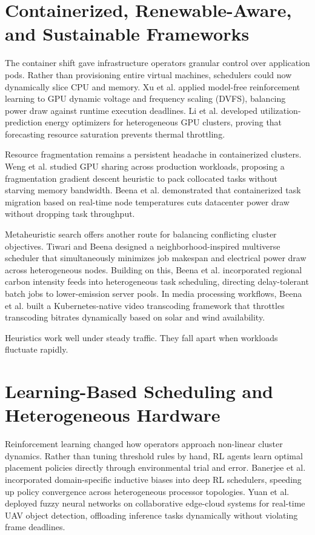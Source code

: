 \documentclass[12pt]{report}
\begin{document}
\section{Containerized, Renewable-Aware, and Sustainable Frameworks}

The container shift gave infrastructure operators granular control over application pods. Rather than provisioning entire virtual machines, schedulers could now dynamically slice CPU and memory. Xu et al. \cite{xu2022} applied model-free reinforcement learning to GPU dynamic voltage and frequency scaling (DVFS), balancing power draw against runtime execution deadlines. Li et al. \cite{li2023} developed utilization-prediction energy optimizers for heterogeneous GPU clusters, proving that forecasting resource saturation prevents thermal throttling. 

Resource fragmentation remains a persistent headache in containerized clusters. Weng et al. \cite{weng2023} studied GPU sharing across production workloads, proposing a fragmentation gradient descent heuristic to pack collocated tasks without starving memory bandwidth. Beena et al. \cite{beena2025adaptive} demonstrated that containerized task migration based on real-time node temperatures cuts datacenter power draw without dropping task throughput. 

Metaheuristic search offers another route for balancing conflicting cluster objectives. Tiwari and Beena \cite{tiwari2024} designed a neighborhood-inspired multiverse scheduler that simultaneously minimizes job makespan and electrical power draw across heterogeneous nodes. Building on this, Beena et al. \cite{beena2025carbon} incorporated regional carbon intensity feeds into heterogeneous task scheduling, directing delay-tolerant batch jobs to lower-emission server pools. In media processing workflows, Beena et al. \cite{beena2025video} built a Kubernetes-native video transcoding framework that throttles transcoding bitrates dynamically based on solar and wind availability.

Heuristics work well under steady traffic. They fall apart when workloads fluctuate rapidly.

\section{Learning-Based Scheduling and Heterogeneous Hardware}

Reinforcement learning changed how operators approach non-linear cluster dynamics. Rather than tuning threshold rules by hand, RL agents learn optimal placement policies directly through environmental trial and error. Banerjee et al. \cite{banerjee2019} incorporated domain-specific inductive biases into deep RL schedulers, speeding up policy convergence across heterogeneous processor topologies. Yuan et al. \cite{yuan2024} deployed fuzzy neural networks on collaborative edge-cloud systems for real-time UAV object detection, offloading inference tasks dynamically without violating frame deadlines.
\end{document}
